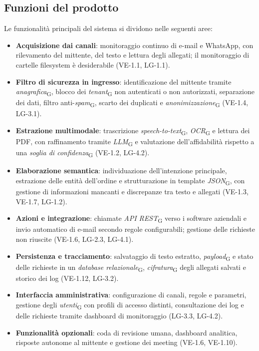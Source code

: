 \subsection{Funzioni del prodotto}
Le funzionalità principali del sistema si dividono nelle seguenti aree:
	\begin{itemize}
		\item \textbf{Acquisizione dai canali}: monitoraggio continuo di e-mail e WhatsApp, con rilevamento del mittente, del testo e lettura degli allegati; il monitoraggio di cartelle filesystem è desiderabile (VE-1.1, LG-1.1).
		\item \textbf{Filtro di sicurezza in ingresso}: identificazione del mittente tramite \textit{anagrafica}\textsubscript{G}, blocco dei \textit{tenant}\textsubscript{G} non autenticati o non autorizzati, separazione dei dati, filtro anti-\textit{spam}\textsubscript{G}, scarto dei duplicati e \textit{anonimizzazione}\textsubscript{G} (VE-1.4, LG-3.1).
		\item \textbf{Estrazione multimodale}: trascrizione \textit{speech-to-text}\textsubscript{G}, \textit{OCR}\textsubscript{G} e lettura dei PDF, con raffinamento tramite \textit{LLM}\textsubscript{G} e valutazione dell'affidabilità rispetto a una \textit{soglia di confidenza}\textsubscript{G} (VE-1.2, LG-4.2).
		\item \textbf{Elaborazione semantica}: individuazione dell'intenzione principale, estrazione delle entità dell'ordine e strutturazione in template \textit{JSON}\textsubscript{G}, con gestione di informazioni mancanti e discrepanze tra testo e allegati (VE-1.3, VE-1.7, LG-1.2).
		\item \textbf{Azioni e integrazione}: chiamate \textit{API REST}\textsubscript{G} verso i software aziendali e invio automatico di e-mail secondo regole configurabili; gestione delle richieste non riuscite (VE-1.6, LG-2.3, LG-4.1).
		\item \textbf{Persistenza e tracciamento}: salvataggio di testo estratto, \textit{payload}\textsubscript{G} e stato delle richieste in un \textit{database relazionale}\textsubscript{G}, \textit{cifratura}\textsubscript{G} degli allegati salvati e storico dei log (VE-1.12, LG-3.2).
		\item \textbf{Interfaccia amministrativa}: configurazione di canali, regole e parametri, gestione degli \textit{utenti}\textsubscript{G} con profili di accesso distinti, consultazione dei log e delle richieste tramite dashboard di monitoraggio (LG-3.3, LG-4.2).
		\item \textbf{Funzionalità opzionali}: coda di revisione umana, dashboard analitica, risposte autonome al mittente e gestione dei meeting (VE-1.6, VE-1.10).
	\end{itemize}

